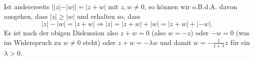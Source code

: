\documentclass[a4paper,10pt]{article}
\begin{document}
Ist andererseits $||z|-|w|| = |z+w|$ mit $z, w \neq 0$, so können wir o.B.d.A. davon ausgehen, dass $|z| \geq |w|$ und erhalten so, dass
\[
 |z|-|w| = |z+w| \Rightarrow |z| = |z+w|+|w| = |z+w| + |-w|.
\]
Es ist nach der obigen Diskussion also $z+w=0$ (also $w = -z$) oder $-w = 0$ (was im Widerspruch zu $w \neq 0$ steht) oder $z+w = - \lambda w$ und damit $w = - \frac{1}{1+\lambda} z$ für ein $\lambda > 0$.
\end{document}
